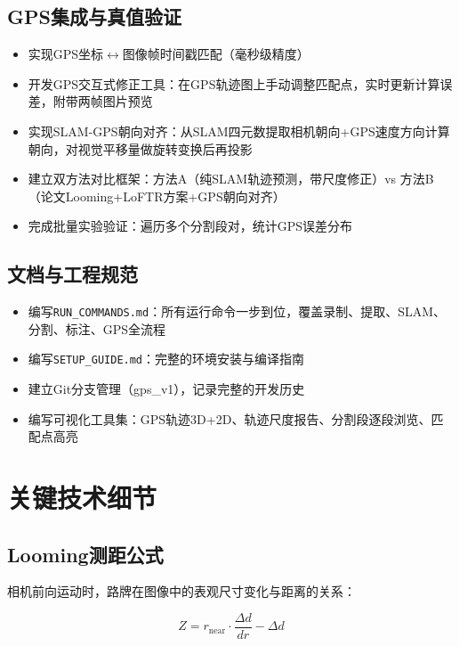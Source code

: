 \documentclass[12pt,a4paper]{ctexart}
\begin{document}
\subsection{GPS集成与真值验证}

\begin{itemize}
    \item 实现GPS坐标$\leftrightarrow$图像帧时间戳匹配（毫秒级精度）
    \item 开发GPS交互式修正工具：在GPS轨迹图上手动调整匹配点，实时更新计算误差，附带两帧图片预览
    \item 实现SLAM-GPS朝向对齐：从SLAM四元数提取相机朝向+GPS速度方向计算朝向，对视觉平移量做旋转变换后再投影
    \item 建立双方法对比框架：方法A（纯SLAM轨迹预测，带尺度修正）vs 方法B（论文Looming+LoFTR方案+GPS朝向对齐）
    \item 完成批量实验验证：遍历多个分割段对，统计GPS误差分布
\end{itemize}

\subsection{文档与工程规范}

\begin{itemize}
    \item 编写\texttt{RUN\_COMMANDS.md}：所有运行命令一步到位，覆盖录制、提取、SLAM、分割、标注、GPS全流程
    \item 编写\texttt{SETUP\_GUIDE.md}：完整的环境安装与编译指南
    \item 建立Git分支管理（gps\_v1），记录完整的开发历史
    \item 编写可视化工具集：GPS轨迹3D+2D、轨迹尺度报告、分割段逐段浏览、匹配点高亮
\end{itemize}

\section{关键技术细节}

\subsection{Looming测距公式}

相机前向运动时，路牌在图像中的表观尺寸变化与距离的关系：

\begin{equation}
Z = r_{\text{near}} \cdot \frac{\Delta d}{dr} - \Delta d
\end{equation}
\end{document}
